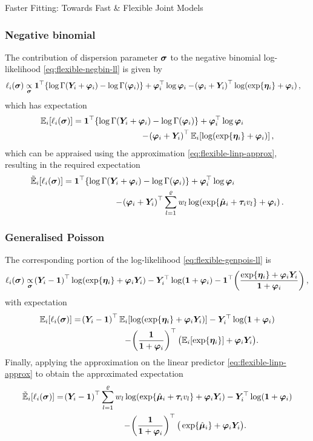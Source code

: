 \begin{chapter}{\label{cha:flexible}Faster Fitting: Towards Fast \& Flexible Joint Models}
\subsubsection{Negative binomial}
The contribution of dispersion parameter $\bm{\sigma}$ to the negative binomial log-likelihood \eqref{eq:flexible-negbin-ll} is given by
\begin{align*}
    \ell_i\!\left(\bm{\sigma}\right)&\underset{\bm{\sigma}}{\propto}\bm{1}^\top\!\left\{\log\Gamma\!\left(\bm{Y}_i+\bm{\varphi}_i\right)-\log\Gamma\!\left(\bm{\varphi}_i\right)\right\} + \bm{\varphi}_i^\top\log\bm{\varphi}_i-\!\left(\bm{\varphi}_i+\bm{Y}_i\right)^\top\log\!\left(\exp\!\left\{\bm{\eta}_i\right\}+\bm{\varphi}_i\right),
\end{align*}
which has expectation 
\begin{align*}
    \Expi{\elli{\bs}}&=\boneT\lbr\lgam{\Y+\bphi}-\lgam{\bphi}\rbr + \bphi^\top\log\bphi\\&\qquad\qquad\qquad\qquad-\lb\bphi+\Y\rb^\top\Expi{\log\lb\exp\lbr\linp\rbr+\bphi\rb},
\end{align*}
which can be appraised using the approximation \eqref{eq:flexible-linp-approx}, resulting in the required expectation 
\begin{equation}
    \begin{aligned}
        \tExpi{\elli{\bs}}&=\boneT\lbr\lgam{\Y+\bphi}-\lgam{\bphi}\rbr + \bphi^\top\log\bphi\\&\qquad\qquad\qquad-\lb\bphi+\Y\rb^\top\Sl w_l\log\lb\exp\lbr\hbmu+\btau v_l\rbr+\bphi\rb.
    \end{aligned}
\label{eq:flexible-Mstep-sigma-negbin}
\end{equation}
\subsubsection{Generalised Poisson}
The corresponding portion of the log-likelihood \eqref{eq:flexible-genpois-ll} is 
\begin{align*}
    \ell_i\!\left(\bm{\sigma}\right)\underset{\bm{\sigma}}{\propto}\!\left(\bm{Y}_i-\bm{1}\right)^\top\log\!\left(\exp\!\left\{\bm{\eta}_i\right\}+\bm{\varphi}_i\bm{Y}_i\right)-\bm{Y}_i^\top\log\!\left(\bm{1}+\bm{\varphi}_i\right)-\bm{1}^\top\!\left(\frac{\exp\!\left\{\bm{\eta}_i\right\}+\bm{\varphi}_i\bm{Y}_i}{\bm{1}+\bm{\varphi}_i}\right),
\end{align*}
with expectation
\begin{align*}
    \Expi{\elli{\bs}}&=\lb\Y-\bm{1}\rb^\top\Expi{\log\lb\exp\lbr\linp\rbr+\bphi\Y\rb}-\Y^\top\log\lb\bm{1}+\bphi\rb\\&\qquad\qquad\qquad-\lb\frac{\bm{1}}{\bm{1}+\bphi}\rb^\top \big(\Expi{\exp\lbr\linp\rbr}+\bphi\Y\big).
\end{align*}
Finally, applying the approximation on the linear predictor \eqref{eq:flexible-linp-approx} to obtain the approximated expectation
\begin{equation}
    \begin{aligned}
        \tExpi{\elli{\bs}}&=\lb\Y-\bm{1}\rb^\top\Sl w_l\log\lb\exp\lbr\hbmu+\btau v_l\rbr+\bphi\Y\rb-\Y^\top\log\lb\bm{1}+\bphi\rb\\&\qquad\qquad\qquad\qquad-\lb\frac{\bm{1}}{\bm{1}+\bphi}\rb^\top \big(\exp\lbr\hbmu\rbr+\bphi\Y\big).
    \end{aligned}
\label{eq:flexible-Mstep-sigma-genpois}
\end{equation}

\end{chapter}
